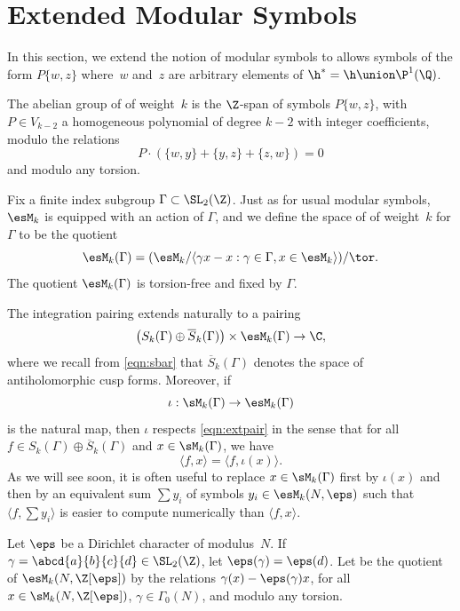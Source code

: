 \section{Extended Modular Symbols}\label{defn:extendedmodsyms}%
In this section, we extend the notion of modular
symbols to allows symbols of the form
$P\{w,z\}$ where~$w$ and~$z$ are
arbitrary elements of $\h^*=\h\union\P^1(\Q)$.  
\begin{definition}
  The abelian group  
  of  of weight~$k$
is the $\Z$-span of symbols $P\{w,z\}$, with $P\in
  V_{k-2}$ a homogeneous polynomial of degree $k-2$ with integer
  coefficients, modulo the relations $$P\cdot (\{w,y\} + \{y,z\} +
  \{z,w\}) = 0$$
  and modulo any torsion.
\end{definition}

Fix a finite index subgroup $\Gamma\subset \SL_2(\Z)$.
Just as for usual modular symbols, $\esM_k$ is equipped with
an action of $\Gamma$, and we
define the space of  of weight~$k$
for $\Gamma$ to be the quotient
$$
  \esM_k(\Gamma) = (\esM_k/\langle \gamma x - x : \gamma\in\Gamma, x \in \esM_k\rangle)/\tor.
$$
The quotient $\esM_k(\Gamma)$ is torsion-free and fixed by $\Gamma$.

The integration  pairing extends naturally to a pairing
\begin{equation}\label{eqn:extpair}
      \left(S_k(\Gamma) \oplus \overline{S}_k(\Gamma)\right) 
\times 
\esM_k(\Gamma) 
\to \C,
    \end{equation}
where we recall from \eqref{eqn:sbar} that  $\overline{S}_k(\Gamma)$ denotes 
the space of antiholomorphic cusp forms.
Moreover, if
$$
  \iota: \sM_k(\Gamma)\rightarrow \esM_k(\Gamma)
$$
is the natural map, then $\iota$
respects \eqref{eqn:extpair} in the sense that
for all $f \in S_k(\Gamma) \oplus \overline{S}_k(\Gamma)$
and $x\in \sM_k(\Gamma)$, we have
$$
   \langle f, x\rangle = \langle f , \iota(x)\rangle.
$$
As we will see soon, it
is often useful to replace
$x\in\sM_k(\Gamma)$ first by $\iota(x)$ and then 
by an equivalent sum $\sum y_i$ of symbols 
$y_i\in \esM_k(N,\eps)$ such that
$\langle f, \sum y_i \rangle$ is easier to 
compute numerically than $\langle f, x\rangle$.


Let $\eps$ be a Dirichlet character of modulus~$N$.
If $\gamma=\abcd{a}{b}{c}{d} \in \SL_2(\Z)$, let $\eps(\gamma)=\eps(d)$.\index{$\eps(\gamma)$}
Let  be the quotient of
$\esM_k(N,\Z[\eps])$ by the relations $\gamma(x) -
\eps(\gamma) x$, for all $x \in \sM_k(N,\Z[\eps])$,
$\gamma \in \Gamma_0(N)$, and modulo any torsion.  


